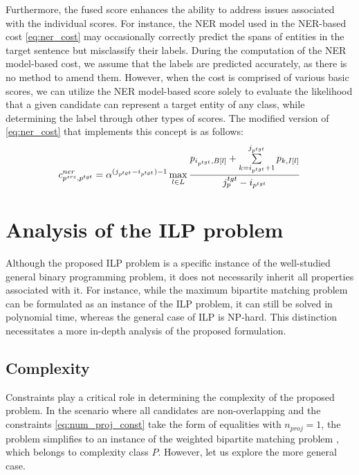 Furthermore, the fused score enhances the ability to address issues associated with
the individual scores. For instance, the NER model used in the NER-based cost
\eqref{eq:ner_cost} may occasionally correctly predict the spans of entities in the
target sentence but misclassify their labels. During the computation of the NER
model-based cost, we assume that the labels are predicted accurately, as there is
no method to amend them. However, when the cost is comprised of various basic scores,
we can utilize the NER model-based score solely to evaluate the likelihood that a
given candidate can represent a target entity of any class, while determining the
label through other types of scores. The modified version of \eqref{eq:ner_cost} that
implements this concept is as follows:
\begin{equation} \label{eq:ner_cost_wo_classes}
  c_{p^{src}, p^{tgt}}^{ner} = \alpha^{(j_{p^{tgt}} - i_{p^{tgt}}) - 1}
  \max\limits_{l \in L}
  \frac{
    p_{i_{p^{tgt}}, B[l]} +
    \sum\limits_{k = i_{p^{tgt}} + 1}^{j_{p^{tgt}}} p_{k, I[l]}
  }
  {j_p^{tgt} - i_{p^{tgt}}}
\end{equation}

\section{Analysis of the ILP problem}
Although the proposed ILP problem is a specific instance of the
well-studied general binary programming problem, it does not
necessarily inherit all properties associated with it. For instance,
while the maximum bipartite matching problem \cite{pemmaraju2003computational} can be formulated as an
instance of the ILP problem, it can still be solved in polynomial
time, whereas the general case of ILP is NP-hard. This distinction
necessitates a more in-depth analysis of the proposed formulation.

\subsection{Complexity}
Constraints play a critical role in determining the complexity of the proposed problem.
In the scenario where all candidates are non-overlapping and the constraints
\eqref{eq:num_proj_const} take the form of equalities with \( n_{proj} = 1 \),
the problem simplifies to an instance of the weighted bipartite matching problem
\cite{pemmaraju2003computational}, which belongs to complexity class \( P \).
However, let us explore the more general case.

